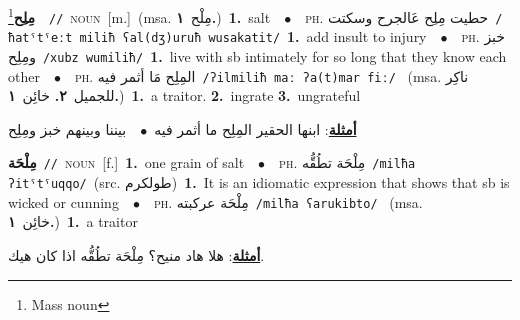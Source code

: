 \documentclass[10pt,a4paper,twoside]{article} %
\begin{document}
\begin{multicols}{2}
{\setlength\topsep{0pt}\textbf{\foreignlanguage{arabic}{مِلِح}}\footnote{Mass noun}\ \ {\color{gray}\texttt{//}\color{black}}\ \textsc{noun}\ [m.]\ \color{gray}(msa. \foreignlanguage{arabic}{مِلْح}~\foreignlanguage{arabic}{\textbf{١.}})\color{black}\ \textbf{1.}~salt\ \ $\bullet$\ \ \textsc{ph.} \color{gray} \foreignlanguage{arabic}{حطيت مِلِح عَالجرح وسكتت}\color{black}\ {\color{gray}\texttt{/{\sffamily ħatˤtˤeːt miliħ ʕal(dʒ)uruħ wusakatit}/}\color{black}}\ \textbf{1.}~add insult to injury\ \ $\bullet$\ \ \textsc{ph.} \color{gray} \foreignlanguage{arabic}{خبز ومِلِح}\color{black}\ {\color{gray}\texttt{/{\sffamily xubz wumiliħ}/}\color{black}}\ \textbf{1.}~live with sb intimately for so long that they know each other\ \ $\bullet$\ \ \textsc{ph.} \color{gray} \foreignlanguage{arabic}{المِلِح مَا أثمر فيه}\color{black}\ {\color{gray}\texttt{/{\sffamily ʔilmiliħ maː ʔa(t)mar fiː}/}\color{black}}\ \color{gray} (msa. \foreignlanguage{arabic}{ناكِر للجميل}~\foreignlanguage{arabic}{\textbf{٢.}}  \foreignlanguage{arabic}{خائِن}~\foreignlanguage{arabic}{\textbf{١.}})\color{black}\ \textbf{1.}~a traitor.  \textbf{2.}~ingrate  \textbf{3.}~ungrateful\  \begin{flushright}\color{gray}\foreignlanguage{arabic}{\textbf{\underline{\foreignlanguage{arabic}{أمثلة}}}: ابنها الحقير المِلِح ما أثمر فيه\ $\bullet$\ \  بيننا وبينهم خبز ومِلِح}\end{flushright}\color{black}} \vspace{2mm}

{\setlength\topsep{0pt}\textbf{\foreignlanguage{arabic}{مِلْحَة}}\ {\color{gray}\texttt{//}\color{black}}\ \textsc{noun}\ [f.]\ \textbf{1.}~one grain of salt\ \ $\bullet$\ \ \textsc{ph.} \color{gray} \foreignlanguage{arabic}{مِلْحَة تطُقُّه}\color{black}\ {\color{gray}\texttt{/{\sffamily milħa ʔitˤtˤuqqo}/}\color{black}}\ \color{gray}(src. \foreignlanguage{arabic}{طولكرم})\color{black}\ \textbf{1.}~It is an idiomatic expression that shows that sb is wicked or cunning\ \ $\bullet$\ \ \textsc{ph.} \color{gray} \foreignlanguage{arabic}{مِلْحَة عركبته}\color{black}\ {\color{gray}\texttt{/{\sffamily milħa ʕarukibto}/}\color{black}}\ \color{gray} (msa. \foreignlanguage{arabic}{خائِن}~\foreignlanguage{arabic}{\textbf{١.}})\color{black}\ \textbf{1.}~a traitor\  \begin{flushright}\color{gray}\foreignlanguage{arabic}{\textbf{\underline{\foreignlanguage{arabic}{أمثلة}}}: هلا هاد منيح؟ مِلْحَة تطُقُّه اذا كان هيك.}\end{flushright}\color{black}} \vspace{2mm}


\end{multicols}
\end{document}
